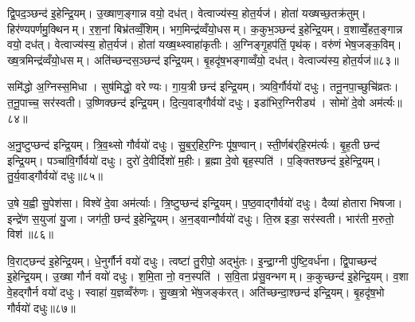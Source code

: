 द्वि॒पद॒ञ्छन्द॑ इ॒हेन्द्रि॒यम्। उ॒ख्षाण॒ङ्गान्न वयो॒ दध॑त्। वेत्वाज्य॑स्य॒ होत॒र्यज॑। होता॑ यख्षच्छ॒तक्र॑तुम्। हिर॑ण्यपर्णमु॒क्थिनम्। र॒श॒नां बिभ्र॑तव्वँ॒शिम्। भग॒मिन्द्र॑व्वँयो॒धसम्। क॒कुभ॒ञ्छन्द॑ इ॒हेन्द्रि॒यम्। व॒शाव्वेँ॒हत॒ङ्गान्न वयो॒ दध॑त्। वेत्वाज्य॑स्य॒ होत॒र्यज॑। होता॑ यख्ष॒थ्स्वाहा॑कृतीः। अ॒ग्निङ्गृ॒हप॑तिं॒ पृथ॑क्। वरु॑णं भेष॒जङ्क॒विम्। ख्ष॒त्रमिन्द्र॑व्वँयो॒धसम्। अति॑च्छन्दस॒ञ्छन्द॑ इन्द्रि॒यम्। बृ॒हदृ॑ष॒भङ्गाव्वँयो॒ दध॑त्। वेत्वाज्य॑स्य॒ होत॒र्यज॑॥८३॥

समि॑द्धो अ॒ग्निस्स॒मिधा। सुष॑मिद्धो॒ वरेण्यः। गा॒य॒त्री छन्द॑ इन्द्रि॒यम्। त्र्यवि॒र्गौर्वयो॑ दधुः। तनू॒नपा॒च्छुचि॑व्रतः। त॒नू॒पाच्च॒ सर॑स्वती। उ॒ष्णिक्छन्द॑ इन्द्रि॒यम्। दि॒त्य॒वाड्गौर्वयो॑ दधुः। इडा॑भिर॒ग्निरीड्य॑। सोमो॑ दे॒वो अम॑र्त्यः॥८४॥

अ॒नु॒ष्टुप्छन्द॑ इन्द्रि॒यम्। त्रि॒व॒थ्सो गौर्वयो॑ दधुः। सु॒ब॒र्॒हिर॒ग्निः पू॑ष॒ण्वान्। स्ती॒र्णब॑र्‌हि॒रम॑र्त्यः। बृ॒ह॒ती छन्द॑ इन्द्रि॒यम्। पञ्चा॑वि॒र्गौर्वयो॑ दधुः। दुरो॑ दे॒वीर्दिशो॑ म॒हीः। ब्र॒ह्मा दे॒वो बृह॒स्पति॑। प॒ङ्क्तिश्छन्द॑ इ॒हेन्द्रि॒यम्। तु॒र्य॒वाड्गौर्वयो॑ दधुः॥८५॥

उ॒षे य॒ह्वी सु॒पेश॑सा। विश्वे॑ दे॒वा अम॑र्त्याः। त्रि॒ष्टुप्छन्द॑ इन्द्रि॒यम्। प॒ष्ठ॒वाद्गौर्वयो॑ दधुः। दैव्या॑ होतारा भिषजा। इन्द्रे॑ण स॒युजा॑ यु॒जा। जग॑ती॒ छन्द॑ इ॒हेन्द्रि॒यम्। अ॒न॒ड्वान्गौर्वयो॑ दधुः। ति॒स्र इडा॒ सर॑स्वती। भार॑ती म॒रुतो॒ विश॑॥८६॥

वि॒राट्छन्द॑ इ॒हेन्द्रि॒यम्। धे॒नुर्गौर्न वयो॑ दधुः। त्वष्टा॑ तु॒रीपो॒ अद्भु॑तः। इ॒न्द्रा॒ग्नी पु॑ष्टि॒वर्ध॑ना। द्वि॒पाच्छन्द॑ इ॒हेन्द्रि॒यम्। उ॒ख्षा गौर्न वयो॑ दधुः। श॒मि॒ता नो॒ वन॒स्पति॑। स॒वि॒ता प्र॑सु॒वन्भगम्। क॒कुच्छन्द॑ इ॒हेन्द्रि॒यम्। व॒शा वे॒हद्गौर्न वयो॑ दधुः। स्वाहा॑ य॒ज्ञव्वँरु॑णः। सु॒ख्ष॒त्रो भे॑ष॒जङ्क॑रत्। अति॑च्छन्दा॒श्छन्द॑ इन्द्रि॒यम्। बृ॒हदृ॑ष॒भो गौर्वयो॑ दधुः॥८७॥\anuvakamend[अम॑र्त्यस्तुर्य॒वाड्गौर्वयो॑ दधु॒र्विशो॑ व॒शा वे॒हद्गौर्न वयो॑ दधुश्च॒त्वारि॑ च]

